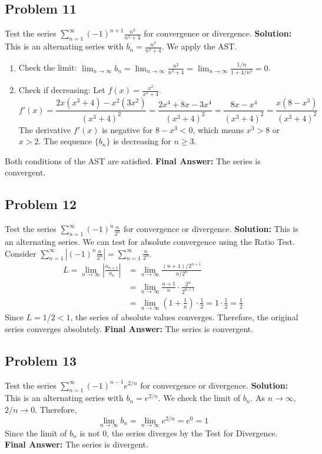 \documentclass{article}
\begin{document}
\subsection*{Problem 11}
Test the series $\sum_{n=1}^{\infty} (-1)^{n+1} \frac{n^2}{n^3+4}$ for convergence or divergence.
\textbf{Solution:} This is an alternating series with $b_n = \frac{n^2}{n^3+4}$. We apply the AST.
\begin{enumerate}
    \item Check the limit: $\lim_{n \to \infty} b_n = \lim_{n \to \infty} \frac{n^2}{n^3+4} = \lim_{n \to \infty} \frac{1/n}{1+4/n^3} = 0$.
    \item Check if decreasing: Let $f(x) = \frac{x^2}{x^3+4}$.
    \[ f'(x) = \frac{2x(x^3+4) - x^2(3x^2)}{(x^3+4)^2} = \frac{2x^4+8x-3x^4}{(x^3+4)^2} = \frac{8x-x^4}{(x^3+4)^2} = \frac{x(8-x^3)}{(x^3+4)^2} \]
    The derivative $f'(x)$ is negative for $8-x^3 < 0$, which means $x^3 > 8$ or $x > 2$. The sequence $\{b_n\}$ is decreasing for $n \ge 3$.
\end{enumerate}
Both conditions of the AST are satisfied.
\textbf{Final Answer:} The series is convergent.

\subsection*{Problem 12}
Test the series $\sum_{n=1}^{\infty} (-1)^n \frac{n}{2^n}$ for convergence or divergence.
\textbf{Solution:} This is an alternating series. We can test for absolute convergence using the Ratio Test.
Consider $\sum_{n=1}^{\infty} \left| (-1)^n \frac{n}{2^n} \right| = \sum_{n=1}^{\infty} \frac{n}{2^n}$.
\begin{align*}
    L = \lim_{n \to \infty} \left| \frac{a_{n+1}}{a_n} \right| &= \lim_{n \to \infty} \frac{(n+1)/2^{n+1}}{n/2^n} \\
    &= \lim_{n \to \infty} \frac{n+1}{n} \cdot \frac{2^n}{2^{n+1}} \\
    &= \lim_{n \to \infty} \left(1 + \frac{1}{n}\right) \cdot \frac{1}{2} = 1 \cdot \frac{1}{2} = \frac{1}{2}
\end{align*}
Since $L=1/2 < 1$, the series of absolute values converges. Therefore, the original series converges absolutely.
\textbf{Final Answer:} The series is convergent.

\subsection*{Problem 13}
Test the series $\sum_{n=1}^{\infty} (-1)^{n-1} e^{2/n}$ for convergence or divergence.
\textbf{Solution:} This is an alternating series with $b_n = e^{2/n}$. We check the limit of $b_n$.
As $n \to \infty$, $2/n \to 0$. Therefore,
\[ \lim_{n \to \infty} b_n = \lim_{n \to \infty} e^{2/n} = e^0 = 1 \]
Since the limit of $b_n$ is not 0, the series diverges by the Test for Divergence.
\textbf{Final Answer:} The series is divergent.
\end{document}
